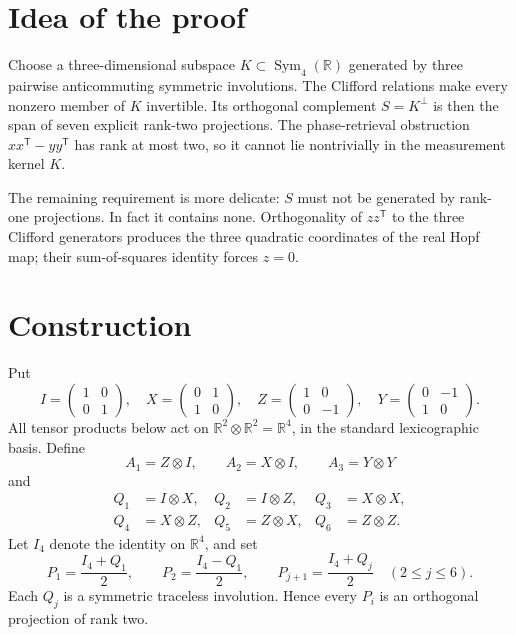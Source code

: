 \documentclass[11pt]{article}
\newcommand{\R}{\mathbb R}
\newcommand{\Sym}{\operatorname{Sym}}
\begin{document}
\section*{Idea of the proof}

Choose a three-dimensional subspace \(K\subset\Sym_4(\R)\) generated by
three pairwise anticommuting symmetric involutions.  The Clifford relations
make every nonzero member of \(K\) invertible.  Its orthogonal complement
\(S=K^\perp\) is then the span of seven explicit rank-two projections.
The phase-retrieval obstruction \(xx^{\mathsf T}-yy^{\mathsf T}\) has rank at
most two, so it cannot lie nontrivially in the measurement kernel \(K\).

The remaining requirement is more delicate: \(S\) must not be generated by
rank-one projections.  In fact it contains none.  Orthogonality of
\(zz^{\mathsf T}\) to the three Clifford generators produces the three
quadratic coordinates of the real Hopf map; their sum-of-squares identity
forces \(z=0\).

\section*{Construction}

Put
\[
 I=\begin{pmatrix}1&0\\0&1\end{pmatrix},\quad
 X=\begin{pmatrix}0&1\\1&0\end{pmatrix},\quad
 Z=\begin{pmatrix}1&0\\0&-1\end{pmatrix},\quad
 Y=\begin{pmatrix}0&-1\\1&0\end{pmatrix}.
\]
All tensor products below act on \(\R^2\otimes\R^2=\R^4\), in the standard
lexicographic basis.  Define
\[
 A_1=Z\otimes I,\qquad A_2=X\otimes I,\qquad A_3=Y\otimes Y
\]
and
\begin{align*}
 Q_1&=I\otimes X,& Q_2&=I\otimes Z,& Q_3&=X\otimes X,\\
 Q_4&=X\otimes Z,& Q_5&=Z\otimes X,& Q_6&=Z\otimes Z.
\end{align*}
Let \(I_4\) denote the identity on \(\R^4\), and set
\[
 P_1=\frac{I_4+Q_1}{2},\qquad
 P_2=\frac{I_4-Q_1}{2},\qquad
 P_{j+1}=\frac{I_4+Q_j}{2}\quad(2\leq j\leq6).
\]
Each \(Q_j\) is a symmetric traceless involution.  Hence every \(P_i\) is
an orthogonal projection of rank two.
\end{document}
